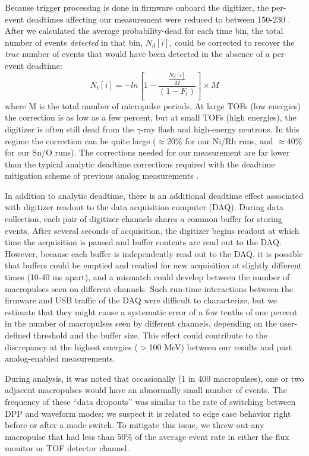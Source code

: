 \documentclass[twocolumn,secnumarabic,amssymb, nobibnotes, aps, prl,
superscriptaddress, nobalancelastpage]{revtex4}
\begin{document}
Because trigger processing is done in firmware onboard the digitizer,
the per-event deadtimes affecting our
measurement were reduced to between 150-230 \nano\second.
After we calculated the average probability-dead for each time bin,
the total number of events \textit{detected} in that bin, $N_{d}[i]$, could be
corrected to recover the \textit{true} number of events that would have been
detected in the absence of a per-event deadtime:
\begin{equation}
    N_{t}[i] = -ln\left[1-\frac{\frac{N_{d}[i]}{M}}{(1-F_{i})}\right]\times M
\end{equation}
where M is the total number of micropulse periods. At large TOFs (low energies) 
the correction is as low as a few percent,
but at small TOFs (high energies), the digitizer is often still dead
from the $\gamma$-ray flash and high-energy neutrons. In this regime
the correction can be quite large ($\approx$20\% for our Ni/Rh runs,
and $\approx$40\% for our Sn/O runs). The corrections needed for our measurement
are far lower than the typical analytic deadtime corrections required
with the deadtime mitigation scheme of previous analog measurements \cite{Finlay1993,
Abfalterer2001}.

In addition to analytic deadtime, there is an additional deadtime effect associated with 
digitizer readout to the data acquisition computer (DAQ). During data
collection, each pair of digitizer channels shares a common buffer for storing events.
After several seconds of acquisition, the digitizer begins readout at which time the
acquisition is paused and buffer contents are read out to the DAQ. However,
because each buffer is independently read out to the DAQ, it is possible that buffers
could be emptied and readied for new acquisition at slightly different times
(10-40 ms apart), and a mismatch could develop between the number of macropulses
seen on different channels. Such run-time interactions between the firmware and USB
traffic of the DAQ were difficult to characterize, but we estimate that they might cause a 
systematic error of a few tenths of one percent in the number of macropulses seen
by different channels, depending on the user-defined 
threshold and the buffer size. This effect could contribute to the discrepancy at the
highest energies ($>$100 MeV) between our results and past analog-enabled
measurements.

During analysis, it was noted that occasionally (1 in 400 macropulses), one or two 
adjacent macropulses would have an abnormally small number of events. The frequency
of these ``data dropouts'' was similar to the rate of
switching between DPP and waveform modes; we suspect it is related to edge
case behavior right before or after a mode switch. To mitigate this issue,
we threw out any macropulse that had less than 50\% of the average event rate in either the
flux monitor or TOF detector channel.
\end{document}

